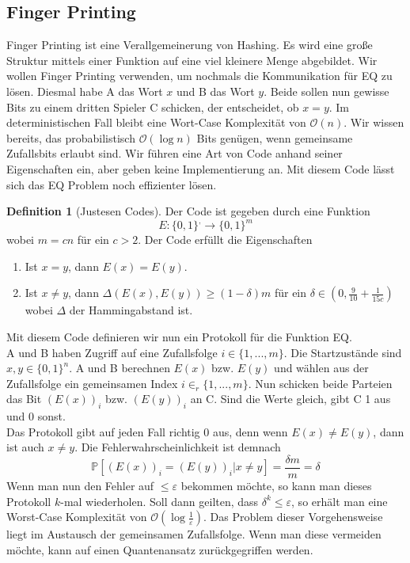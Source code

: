 \documentclass[a4paper, 12pt]{article}
\theoremstyle{plain}
\theoremstyle{definition}
\newtheorem{definition}[theorem]{Definition} %
\theoremstyle{lemma}
\theoremstyle{remark}
\theoremstyle{example}
\begin{document}
	\subsection{Finger Printing}
	Finger Printing ist eine Verallgemeinerung von Hashing. Es wird eine große Struktur mittels einer Funktion auf eine viel kleinere Menge abgebildet. Wir wollen Finger Printing verwenden, um nochmals die Kommunikation für EQ zu lösen. Diesmal habe A das Wort $x$ und B das Wort $y$. Beide sollen nun gewisse Bits zu einem dritten Spieler C schicken, der entscheidet, ob $x=y$. Im deterministischen Fall bleibt eine Wort-Case Komplexität von $\mathcal{O}(n)$. Wir wissen bereits, das probabilistisch $\mathcal{O}(\log n)$ Bits genügen, wenn gemeinsame Zufallsbits erlaubt sind. Wir führen eine Art von Code anhand seiner Eigenschaften ein, aber geben keine Implementierung an. Mit diesem Code lässt sich das EQ Problem noch effizienter lösen.
	\begin{definition}[Justesen Codes]
		Der Code ist gegeben durch eine Funktion \[E: \{0,1\}^, \to \{0,1\}^m\] wobei $m=cn$ für ein $c>2$. Der Code erfüllt die Eigenschaften \begin{enumerate}
			\item Ist $x=y$, dann $E(x)=E(y)$.
			\item Ist $x\neq y$, dann $\Delta(E(x),E(y)) \geq (1-\delta)m$ für ein $\delta \in (0,\frac{9}{10}+\frac{1}{15c})$ wobei $\Delta$ der Hammingabstand ist.
		\end{enumerate}
	\end{definition} 
	Mit diesem Code definieren wir nun ein Protokoll für die Funktion EQ.\\
	A und B haben Zugriff auf eine Zufallsfolge $i \in \{1,...,m\}$. Die Startzustände sind $x,y\in \{0,1\}^n$. A und B berechnen $E(x)$ bzw. $E(y)$ und wählen aus der Zufallsfolge ein gemeinsamen Index $i \in_r \{1,...,m\}$. Nun schicken beide Parteien das Bit $(E(x))_i$ bzw. $(E(y))_i$ an C. Sind die Werte gleich, gibt C 1 aus und 0 sonst.\\
	Das Protokoll gibt auf jeden Fall richtig 0 aus, denn wenn $E(x)\neq E(y)$, dann ist auch $x\neq y$. Die Fehlerwahrscheinlichkeit ist demnach \[\mathbb{P}[(E(x))_i = (E(y))_i | x\neq y] = \frac{\delta m}{m} = \delta\] Wenn man nun den Fehler auf $\leq \varepsilon$ bekommen möchte, so kann man dieses Protokoll $k$-mal wiederholen. Soll dann geilten, dass $\delta^k \leq \varepsilon$, so erhält man eine Worst-Case Komplexität von $\mathcal{O}(\log \frac{1}{\varepsilon})$. Das Problem dieser Vorgehensweise liegt im Austausch der gemeinsamen Zufallsfolge. Wenn man diese vermeiden möchte, kann auf einen Quantenansatz zurückgegriffen werden.\\
\end{document}
